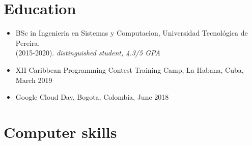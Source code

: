 \documentclass[11pt,a4paper,sans]{moderncv}        %
\begin{document}
\section{Education}
\begin{itemize}
  \item{BSc in Ingenieria en Sistemas y Computacion, Universidad Tecnológica de Pereira. \\ (2015-2020). \textit{distinguished student, 4.3/5 GPA}}
  \item{XII Caribbean Programming Contest Training Camp, La Habana, Cuba, March 2019}
  \item{ Google Cloud Day, Bogota, Colombia, June 2018}
\end{itemize}



\section{Computer skills}


\nocite{*}

\end{document}
